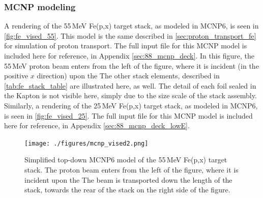 \subsubsection{MCNP modeling}




A rendering of the 55\,MeV Fe(p,x) target stack, as modeled in MCNP6, is seen in \autoref{fig:fe_vised_55}.
This model is the same described in \autoref{sec:proton_transport_fe} for simulation of proton transport.
The full input file for this MCNP model is included here for reference, in Appendix \ref{sec:88_mcnp_deck}.
In this figure, the 55\,MeV proton beam enters from the left of the figure, where it is incident (in the positive $x$ direction) upon the 
The other stack elements, described in  \autoref{tab:fe_stack_table} are illustrated here, as well.
The detail of each foil sealed in the Kapton is not visible here, simply due to the size scale of the stack assembly.
Similarly, a rendering of the 25\,MeV Fe(p,x) target stack, as modeled in MCNP6, is seen in \autoref{fig:fe_vised_25}.
The full input file for this MCNP model is included here for reference, in Appendix \ref{sec:88_mcnp_deck_lowE}.






\begin{figure}
 \centering
 \texttt{[image: ./figures/mcnp\_vised2.png]}
 \caption{ Simplified top-down MCNP6 model of the 55\,MeV Fe(p,x) target stack. The  proton beam enters from the left of the figure, where it is incident upon the  The beam is transported down the length of the stack, towards the rear of the stack on the right side of the figure.
}
 \label{fig:fe_vised_55}
\end{figure}


